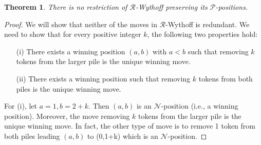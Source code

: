 \documentclass[12pt]{amsart}
\theoremstyle{plain}
\newtheorem{theorem}[proposition]{Theorem}
\theoremstyle{definition}
\theoremstyle{remark}
\begin{document}
\smallskip
\begin{theorem} \label{no-rest-BW}
There is no restriction of ${\mathcal{R}}$-Wythoff preserving its ${\mathcal{P}}$-positions.
\end{theorem}

\begin{proof}
We will show that neither of the moves in ${\mathcal{R}}$-Wythoff is redundant. We need to show that for every positive integer $k$, the following two properties hold:
\begin{itemize}
\item [(i)]  There exists a winning position $(a,b)$ with $a < b$ such that removing $k$ tokens from the larger pile is the unique winning move.
\item [(ii)] There exists a winning position such that removing $k$ tokens from both piles is the unique winning move.
\end{itemize}

For (i), let $a = 1, b = 2+k$. Then $(a,b)$ is an ${\mathcal{N}}$-position (i.e., a winning position). Moreover, the move removing $k$ tokens from the larger pile is the unique winning move. In fact, the other type of move is to remove 1 token from both piles leading $(a,b)$ to (0,1+k) which is an ${\mathcal{N}}$-position.


\end{proof}
\end{document}
